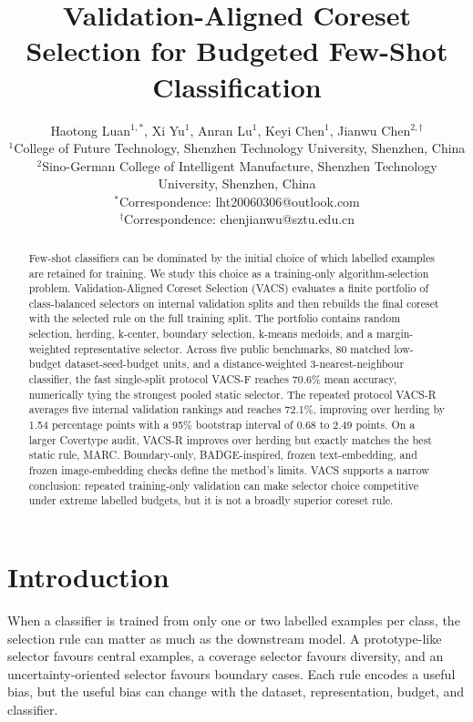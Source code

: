 \documentclass[12pt]{article}
\title{Validation-Aligned Coreset Selection for Budgeted Few-Shot Classification}
\author{
Haotong Luan$^{1,*}$,
Xi Yu$^{1}$,
Anran Lu$^{1}$,
Keyi Chen$^{1}$,
Jianwu Chen$^{2,\dagger}$\\[0.5em]
\small $^{1}$College of Future Technology, Shenzhen Technology University, Shenzhen, China\\
\small $^{2}$Sino-German College of Intelligent Manufacture, Shenzhen Technology University, Shenzhen, China\\
\small $^{*}$Correspondence: lht20060306@outlook.com\\
\small $^{\dagger}$Correspondence: chenjianwu@sztu.edu.cn
}
\date{}
\begin{document}
\maketitle


\begin{abstract}
Few-shot classifiers can be dominated by the initial choice of which labelled examples are retained for training. We study this choice as a training-only algorithm-selection problem. Validation-Aligned Coreset Selection (VACS) evaluates a finite portfolio of class-balanced selectors on internal validation splits and then rebuilds the final coreset with the selected rule on the full training split. The portfolio contains random selection, herding, k-center, boundary selection, k-means medoids, and a margin-weighted representative selector. Across five public benchmarks, 80 matched low-budget dataset-seed-budget units, and a distance-weighted 3-nearest-neighbour classifier, the fast single-split protocol VACS-F reaches 70.6\% mean accuracy, numerically tying the strongest pooled static selector. The repeated protocol VACS-R averages five internal validation rankings and reaches 72.1\%, improving over herding by 1.54 percentage points with a 95\% bootstrap interval of 0.68 to 2.49 points. On a larger Covertype audit, VACS-R improves over herding but exactly matches the best static rule, MARC. Boundary-only, BADGE-inspired, frozen text-embedding, and frozen image-embedding checks define the method's limits. VACS supports a narrow conclusion: repeated training-only validation can make selector choice competitive under extreme labelled budgets, but it is not a broadly superior coreset rule.
\end{abstract}

\section*{Introduction}

When a classifier is trained from only one or two labelled examples per class, the selection rule can matter as much as the downstream model. A prototype-like selector favours central examples, a coverage selector favours diversity, and an uncertainty-oriented selector favours boundary cases. Each rule encodes a useful bias, but the useful bias can change with the dataset, representation, budget, and classifier.
\end{document}
